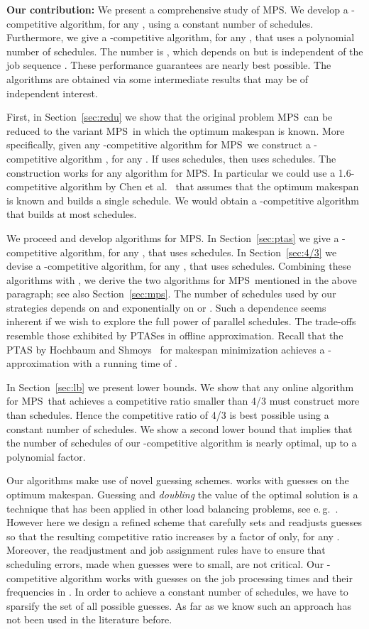 \documentclass{llncs}
\newcommand{\MPS}{{\rm MPS}}
\newcommand{\MPSO}{{\rm MPS}}
\begin{document}
\vspace*{0.1cm}
{\bf Our contribution:}
We present a comprehensive study of \MPS. We develop a -competitive algorithm, for any
, using a constant number of  schedules.
Furthermore, we give a -competitive algorithm, for any , that uses a 
polynomial number of schedules. The number is , which
depends on  but is independent of the job sequence . These performance guarantees are nearly 
best possible. The algorithms are obtained via some intermediate results that may be of 
independent interest.

First, in Section~\ref{sec:redu} we show that the original problem \MPS\ can be reduced to the variant
\MPSO\ in which the optimum makespan is known. More specifically, given any
-competitive algorithm  for \MPSO\ we construct a -competitive algorithm
, for any . If  uses  schedules, then 
uses  schedules. 
The construction works for any algorithm  for \MPSO. In particular we could use a 1.6-competitive
algorithm by Chen et al.~\cite{CKK} that assumes that the optimum makespan is known and builds
a single schedule. We would obtain a -competitive algorithm that builds at most 
 schedules.

We proceed and develop algorithms for \MPSO. In Section~\ref{sec:ptas} we give a -competitive
algorithm, for any , that uses 
 schedules. In Section~\ref{sec:4/3}
we devise a -competitive algorithm, for any , that uses 
 schedules. Combining these algorithms with , we
derive the two algorithms for \MPS\ mentioned in the above paragraph; see also Section~\ref{sec:mps}.
The number of schedules used by our strategies depends on  and exponentially on 
 or . Such a dependence seems inherent if we wish to explore the full power
of parallel schedules. The trade-offs resemble those exhibited by PTASes in offline approximation.
Recall that the PTAS by Hochbaum and Shmoys~\cite{HS} for makespan minimization achieves
a -approximation with a running time of .

In Section~\ref{sec:lb} we present lower bounds. We show that any online algorithm
for \MPS\ that achieves a competitive ratio smaller than 4/3 must construct more than 
schedules. Hence the competitive ratio of 4/3 is best possible using a constant number of
schedules. We show a second lower bound that implies that the number of schedules of our 
-competitive algorithm is nearly optimal, up to a polynomial factor.

Our algorithms make use of novel guessing schemes.  works with guesses on the 
optimum makespan. Guessing and {\em doubling\/} the value of the optimal solution is a technique that
has been applied in other load balancing problems, see e.\,g.~\cite{Azar}. However here we 
design a refined scheme that carefully sets and readjusts guesses so that the resulting competitive
ratio increases by a factor of  only, for any . Moreover, the readjustment
and job assignment rules have to ensure that scheduling errors, made when guesses were to
small, are not critical. Our -competitive algorithm works with guesses on the job processing
times and their frequencies in . In order to achieve a constant number of schedules, we have
to sparsify the set of all possible guesses. As far as we know such an approach has not been used 
in the literature before.
\end{document}
